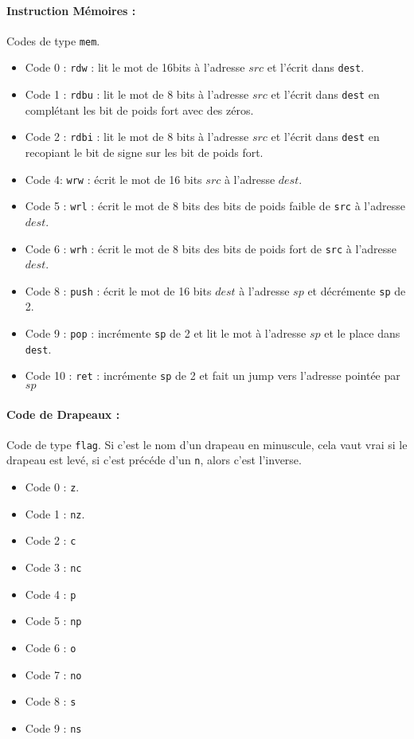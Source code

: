 \documentclass[12pt]{article}
\begin{document}
\paragraph{Instruction Mémoires :} Codes de type \verb!mem!.
\begin{itemize}
\item Code 0 : \verb!rdw! : lit le mot de 16bits à l'adresse $src$ et l'écrit
  dans \verb!dest!.
\item Code 1 : \verb!rdbu! : lit le mot de 8 bits à l'adresse $src$ et l'écrit
  dans \verb!dest! en complétant les bit de poids fort avec des zéros.
\item Code 2 : \verb!rdbi! : lit le mot de 8 bits à l'adresse $src$ et l'écrit
  dans \verb!dest! en recopiant le bit de signe sur les bit de poids fort.
\item Code 4: \verb!wrw! : écrit le mot de 16 bits $src$ à l'adresse $dest$.
\item Code 5 : \verb!wrl! : écrit le mot de 8 bits des bits de poids faible de
  \verb!src! à l'adresse $dest$.
\item Code 6 : \verb!wrh! : écrit le mot de 8 bits des bits de poids fort de
  \verb!src! à l'adresse $dest$.
\item Code 8 : \verb!push! : écrit le mot de 16 bits $dest$ à l'adresse $sp$ et
  décrémente  \verb!sp! de 2.
\item Code 9 : \verb!pop! : incrémente \verb!sp! de 2 et lit le mot à l'adresse $sp$
  et le place dans \verb!dest!.
\item Code 10 : \verb!ret! : incrémente \verb!sp! de 2 et fait un jump vers l'adresse
  pointée par $sp$
\end{itemize}


\paragraph{Code de Drapeaux :} Code de type \verb!flag!. Si c'est le nom d'un
drapeau en minuscule, cela vaut vrai si le drapeau est levé, si c'est précéde
d'un \verb!n!, alors c'est l'inverse.
\begin{itemize}
\item Code 0 : \verb!z!. 
\item Code 1 : \verb!nz!.
\item Code 2 : \verb!c!
\item Code 3 : \verb!nc!
\item Code 4 : \verb!p!
\item Code 5 : \verb!np!
\item Code 6 : \verb!o!
\item Code 7 : \verb!no!
\item Code 8 : \verb!s!
\item Code 9 : \verb!ns!
\end{itemize}
\end{document}
